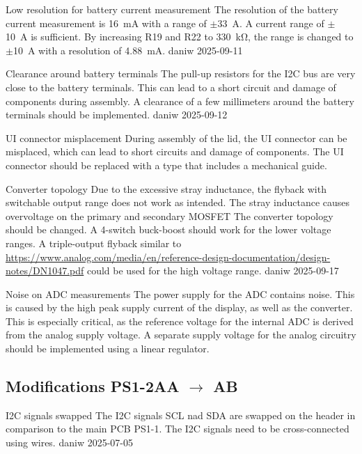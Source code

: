 \begin{ModTable}
\ModItemDone
{Low resolution for battery current measurement}
{The resolution of the battery current measurement is \qty{16}{\milli\ampere} with a range of $\pm$\qty{33}{\ampere}. A current range of $\pm$\qty{10}{\ampere} is sufficient. }
{By increasing R19 and R22 to \qty{330}{\kilo\ohm}, the range is changed to $\pm$\qty{10}{\ampere} with a resolution of \qty{4.88}{\milli\ampere}. }
{daniw}
{2025-09-11}

\ModItemDone
{Clearance around battery terminals}
{The pull-up resistors for the I2C bus are very close to the battery terminals. This can lead to a short circuit and damage of components during assembly. }
{A clearance of a few millimeters around the battery terminals should be implemented. }
{daniw}
{2025-09-12}

\ModItemOpen
{\acs{UI} connector misplacement}
{During assembly of the lid, the \ac{UI} connector can be misplaced, which can lead to short circuits and damage of components. }
{The \ac{UI} connector should be replaced with a type that includes a mechanical guide. }
{}
{}

\ModItemDone
{Converter topology}
{Due to the excessive stray inductance, the flyback with switchable output range does not work as intended. The stray inductance causes overvoltage on the primary and secondary \ac{MOSFET}}
{The converter topology should be changed. A 4-switch buck-boost should work for the lower voltage ranges. A triple-output flyback similar to \url{https://www.analog.com/media/en/reference-design-documentation/design-notes/DN1047.pdf} could be used for the high voltage range. }
{daniw}
{2025-09-17}

\ModItemOpen
{Noise on \acs{ADC} measurements}
{The power supply for the \ac{ADC} contains noise. This is caused by the high peak supply current of the display, as well as the converter. This is especially critical, as the reference voltage for the internal \ac{ADC} is derived from the analog supply voltage. }
{A separate supply voltage for the analog circuitry should be implemented using a linear regulator. }
{}
{}

\end{ModTable}

\FloatBarrier

\subsection{Modifications PS1-2AA $\to$ AB}

\begin{ModTable}

\ModItemDone
{\acs{I2C} signals swapped}
{The \ac{I2C} signals SCL nad SDA are swapped on the header in comparison to the main PCB PS1-1. }
{The \ac{I2C} signals need to be cross-connected using wires. }
{daniw}
{2025-07-05}

\end{ModTable}

